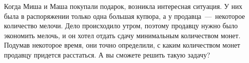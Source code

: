 Когда Миша и Маша покупали подарок, возникла интересная ситуация. У них была в
распоряжении только одна большая купюра, а у продавца~---~некоторое количество мелочи. Дело
происходило утром, поэтому продавцу нужно было экономить мелочь, и он хотел отдать сдачу
минимальным количеством монет. Подумав некоторое время, они точно определили, с каким
количеством монет продавцу придется расстаться. А вы сможете решить такую задачу?
